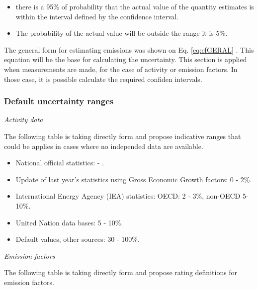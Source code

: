 \documentclass[12pt,graybox,envcountchap,sectrefs]{krantz}
\providecommand{\tightlist}{%
  \setlength{\itemsep}{0pt}\setlength{\parskip}{0pt}}
\theoremstyle{definition}
\theoremstyle{definition}
\theoremstyle{definition}
\theoremstyle{remark}
\begin{document}
\begin{itemize}
\tightlist
\item
  there is a 95\% of probability that the actual value of the quantity
  estimates is within the interval defined by the confidence interval.
\item
  The probability of the actual value will be outside the range it is
  5\%.
\end{itemize}

The general form for estimating emissions was shown on Eq.
\eqref{eq:efGERAL} \citep{guiau}. This equation will be the base for
calculating the uncertainty. This section is applied when measurements
are made, for the case of activity or emission factors. In those case,
it is possible calculate the required confiden intervals.

\subsubsection{Default uncertainty
ranges}\label{default-uncertainty-ranges}

\emph{Activity data}

The following table is taking directly form \citet{guia} and propose
indicative ranges that could be applies in cases where no independed
data are available.

\begin{itemize}
\tightlist
\item
  National official statistics: - .
\item
  Update of last year's statistics using Gross Economic Growth factors:
  0 - 2\%.
\item
  International Energy Agency (IEA) statistics: OECD: 2 - 3\%, non-OECD
  5-10\%.
\item
  United Nation data bases: 5 - 10\%.
\item
  Default values, other sources: 30 - 100\%.
\end{itemize}

\emph{Emission factors}

The following table is taking directly form \citet{guia} and propose
rating definitions for emission factors\citep{guia}.
\end{document}
